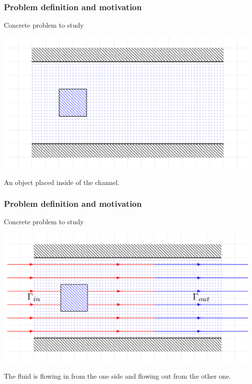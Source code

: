 \documentclass[18pt]{beamer}
\begin{document}
\begin{frame}[t]
  \frametitle{Problem definition and motivation}
  Concrete problem to study
  \vspace*{0.3cm}
  \begin{center}
    \includegraphics[scale=0.2]{images/channel/flow_1}
  \end{center}
  An object placed inside of the channel.
\end{frame}


\begin{frame}[t]
  \frametitle{Problem definition and motivation}
  Concrete problem to study
  \vspace*{0.3cm}
  \begin{center}
    \includegraphics[scale=0.2]{images/channel/flow_2}
  \end{center}
  The fluid is flowing in from the one side and flowing out from the other one.
\end{frame}
\end{document}

